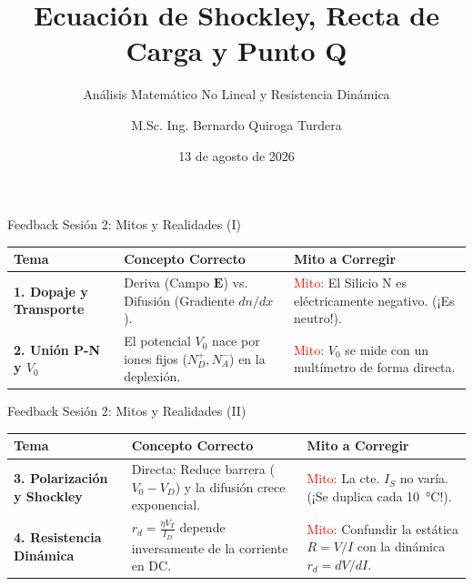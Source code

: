 \documentclass[10pt, aspectratio=169]{beamer}
\title[Shockley y Punto Q]{Ecuación de Shockley, Recta de Carga y Punto Q}
\subtitle{Análisis Matemático No Lineal y Resistencia Dinámica}
\author{M.Sc. Ing. Bernardo Quiroga Turdera}
\institute[UCB Tarija]{Universidad Católica Boliviana ``San Pablo'' -- Sede Tarija}
\date{13 de agosto de 2026}
\begin{document}
\begin{frame}
  \titlepage
\end{frame}

\begin{frame}{Feedback Sesión 2: Mitos y Realidades (I)}
  \begin{table}
    \centering
    \renewcommand{\arraystretch}{1.5}
    \begin{tabularx}{\textwidth}{@{} >{\bfseries}p{3cm} X X @{}}
      \toprule
      Tema & Concepto Correcto & Mito a Corregir \\
      \midrule
      1. Dopaje y Transporte & Deriva (Campo $\mathbf{E}$) vs. Difusión (Gradiente $dn/dx$). & \textcolor{red}{Mito:} El Silicio N es eléctricamente negativo. (¡Es neutro!). \\
      2. Unión P-N y $V_0$ & El potencial $V_0$ nace por iones fijos ($N_D^+, N_A^-$) en la deplexión. & \textcolor{red}{Mito:} $V_0$ se mide con un multímetro de forma directa. \\
      \bottomrule
    \end{tabularx}
  \end{table}
\end{frame}

\begin{frame}{Feedback Sesión 2: Mitos y Realidades (II)}
  \begin{table}
    \centering
    \renewcommand{\arraystretch}{1.5}
    \begin{tabularx}{\textwidth}{@{} >{\bfseries}p{3cm} X X @{}}
      \toprule
      Tema & Concepto Correcto & Mito a Corregir \\
      \midrule
      3. Polarización y Shockley & Directa: Reduce barrera ($V_0 - V_D$) y la difusión crece exponencial. & \textcolor{red}{Mito:} La cte. $I_S$ no varía. (¡Se duplica cada \qty{10}{\celsius}!). \\
      4. Resistencia Dinámica & $r_d = \frac{\eta V_T}{I_D}$ depende inversamente de la corriente en DC. & \textcolor{red}{Mito:} Confundir la estática $R = V/I$ con la dinámica $r_d = dV/dI$. \\
      \bottomrule
    \end{tabularx}
  \end{table}
\end{frame}
\end{document}
